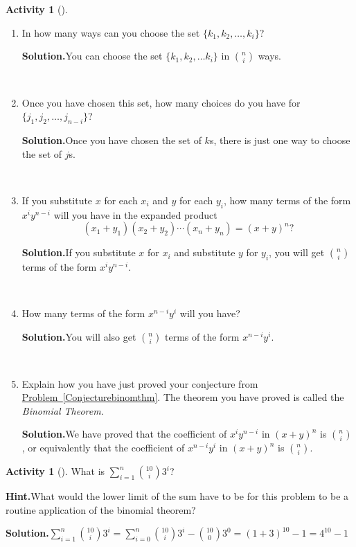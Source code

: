 \documentclass[10pt,]{book}
\theoremstyle{plain}
\theoremstyle{definition}
\newtheorem{activity}[project]{Activity}
\numberwithin{equation}{chapter}
\begin{document}
\begin{activity}[]
\begin{enumerate}[label=(\alph*)]
~\par
\item In how many ways can you choose the set \(\{k_1,k_2,\ldots, k_i\}\)?%
\par\medskip\noindent%
\textbf{Solution.}\quad You can choose the set \(\{k_1,k_2,\ldots k_i\}\) in \(\binom{n}{i}\) ways.%

~\par
\item Once you have chosen this set, how many choices do you have for \(\{j_1,j_2,\ldots, j_{n-i}\}\)?%
\par\medskip\noindent%
\textbf{Solution.}\quad Once you have chosen the set of \(k\)s, there is just one way to choose the set of \(j\)s.%

~\par
\item If you substitute \(x\) for each \(x_i\) and \(y\) for each \(y_i\), how many terms of the form \(x^iy^{n-i}\) will you have in the expanded product%
\begin{equation*}
(x_1+y_1)(x_2+y_2)\cdots (x_n+y_n)=(x+y)^n?
\end{equation*}
%
\par\medskip\noindent%
\textbf{Solution.}\quad If you substitute \(x\) for \(x_i\) and substitute \(y\) for \(y_i\), you will get \(\binom{n}{i}\) terms of the form \(x^iy^{n-i}\).%

~\par
\item How many terms of the form \(x^{n-i}y^i\) will you have?%
\par\medskip\noindent%
\textbf{Solution.}\quad You will also get \(\binom{n}{i}\) terms of the form \(x^{n-i}y^i\).%

~\par
\item Explain how you have just proved your conjecture from \hyperref[Conjecturebinomthm]{Problem~\ref{Conjecturebinomthm}}.  The theorem you have proved is called the \emph{Binomial Theorem}.%
\par\medskip\noindent%
\textbf{Solution.}\quad We have proved that the coefficient of \(x^iy^{n-i}\) in \((x+y)^n\) is \(\binom{n}{i}\), or equivalently that the coefficient of \(x^{n-i}y^i\) in \((x+y)^n\) is \(\binom{n}{i}\).%

\end{enumerate}
\end{activity}
\begin{activity}[]\label{activity-55}
What is \(\sum_{i=1}^n \binom{10}{i}3^i\)?%
\par\medskip\noindent%
\textbf{Hint.}\quad What would the lower limit of the sum have to be for this problem to be a routine application of the binomial theorem?%
\par\medskip\noindent%
\textbf{Solution.}\quad \(\sum_{i=1}^n \binom{10}{i}3^i=\sum_{i=0}^n
\binom{10}{i}3^i-\binom{10}{0}3^0 =(1+3)^{10}-1=4^{10}-1\)%
\end{activity}
\end{document}
